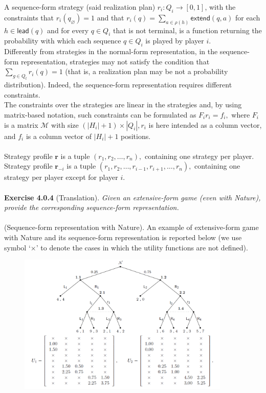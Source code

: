 A sequence-form strategy (said realization plan) $ r_i: Q_i \rightarrow [0,1] $, with the constraints that $ r_{i}(q_\varnothing) = 1 $ and that $ r_{i}(q) = \sum_{a \in \rho(h)} \mathsf{extend} (q,a) $ for each $ h \in \mathsf{lead}(q) $ and for every $ q \in Q_{i} $ that is not terminal, is a function returning the probability with which each sequence $ q \in Q_{i} $ is played by player $i$.\\
Differently from strategies in the normal-form representation, in the sequence-form representation, strategies may not satisfy the condition that $\sum_{g \in Q_{t}} r_{i}(q)=1$ (that is, a realization plan may be not a probability distribution). Indeed, the sequence-form representation requires different constraints.\\
The constraints over the strategies are linear in the strategies and, by using matrix-based notation, such constraints can be formulated as $F_{i} r_{i}=f_{i},$ where $F_{i}$ is a matrix $\mathcal{M}$ with size $\left(\left|H_{i}\right|+1\right) \times\left|Q_{i}\right|, r_{i}$ is here intended as a column vector, and $f_{i}$ is a column vector of $\left|H_{i}\right|+1$ positions.\\\\
Strategy profile $\mathbf{r}$ is a tuple $\left(r_{1}, r_{2}, \ldots, r_{n}\right),$ containing one strategy per player. Strategy profile $\mathbf{r}_{-i}$ is a tuple $\left(r_{1}, r_{2}, \ldots, r_{i-1}, r_{i+1}, \ldots, r_{n}\right),$ containing one strategy per player except for player $i$.\\\\
\textbf{Exercise 4.0.4} (Translation). \textit{Given an extensive-form game (even with Nature), provide the corresponding sequence-form representation.}\\\\
(Sequence-form representation with Nature). An example of extensive-form game with Nature and its sequence-form representation is reported below (we use symbol `$ \times $' to denote the cases in which the utility
functions are not defined).
\begin{figure}[H]
\centering
\includegraphics[width=0.9\textwidth]{images/img_1_4_01.png}
\end{figure}
